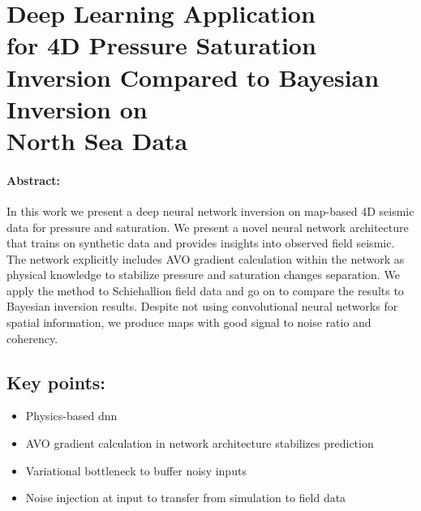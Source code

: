 \section[Deep Learning Application for 4D Pressure Saturation Inversion Compared to Bayesian Inversion on North Sea Data]{Deep Learning Application\\for 4D Pressure Saturation Inversion Compared to Bayesian Inversion on\\North Sea Data}

\paragraph{Abstract:} In this work we present a deep neural network inversion on map-based 4D seismic data for pressure and saturation. We present a novel neural network architecture that trains on synthetic data and provides insights into observed field seismic. The network explicitly includes AVO gradient calculation within the network as physical knowledge to stabilize pressure and saturation changes separation. We apply the method to Schiehallion field data and go on to compare the results to Bayesian inversion results. Despite not using convolutional neural networks for spatial information, we produce maps with good signal to noise ratio and coherency.

\subsection*{Key points:}
\begin{itemize}
    \item Physics-based \acl{dnn}
    \item AVO gradient calculation in network architecture stabilizes prediction
    \item Variational bottleneck to buffer noisy inputs
    \item Noise injection at input to transfer from simulation to field data
\end{itemize}

{\vfill\hfill\newline{}}


